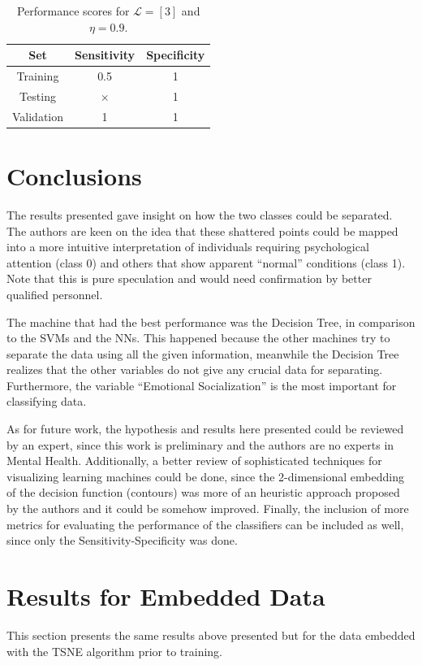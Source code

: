\documentclass[conference]{IEEEtran}
\theoremstyle{definition}
\theoremstyle{remark}
\theoremstyle{remark}
\begin{document}
\begin{table}[H]
  \centering
  \caption{Performance scores for $\mathcal{L}=[3]$ and $\eta=0.9$.}
  \label{tab:L3}
  \begin{tabular}{ccc}
    \hline
    \textbf{Set} & \textbf{Sensitivity} & \textbf{Specificity} \\ \hline
    Training & 0.5 & 1 \\
    Testing & $\times$ & 1 \\
    Validation & 1 & 1 \\ \hline
  \end{tabular}
\end{table}

\section{Conclusions}\label{sec:conc}
The results presented gave insight on how the two classes could be separated.
The authors are keen on the idea that these shattered points could be mapped
into a more intuitive interpretation of individuals requiring psychological
attention (class 0) and others that show apparent ``normal'' conditions (class
1). Note that this is pure speculation and would need confirmation by better
qualified personnel.

The machine that had the best performance was the Decision Tree, in comparison
to the SVMs and the NNs. This happened because the other machines try to
separate the data using all the given information, meanwhile the Decision Tree
realizes that the other variables do not give any crucial data for separating.
Furthermore, the variable ``Emotional Socialization'' is the most important for
classifying data.

As for future work, the hypothesis and results here presented could be reviewed
by an expert, since this work is preliminary and the authors are no experts in
Mental Health. Additionally, a better review of sophisticated techniques for
visualizing learning machines could be done, since the 2-dimensional embedding
of the decision function (contours) was more of an heuristic approach proposed
by the authors and it could be somehow improved. Finally, the inclusion of more
metrics for evaluating the performance of the classifiers can be included as
well, since only the Sensitivity-Specificity was done.

\newpage
\printbibliography

\clearpage
\appendices

\section{Results for Embedded Data}\label{app:emb}
This section presents the same results above presented but for the data embedded
with the TSNE algorithm prior to training.
\end{document}

